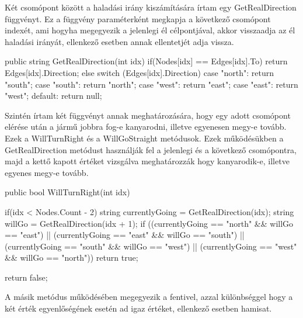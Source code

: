 Két csomópont között a haladási irány kiszámítására írtam egy GetRealDirection függvényt. Ez a függvény paraméterként megkapja a következő csomópont indexét, ami hogyha megegyezik a jelenlegi él célpontjával, akkor visszaadja az él haladási irányát, ellenkező esetben annak ellentetjét adja vissza.
\begin{cpp}
public string GetRealDirection(int idx)
        {
            if(Nodes[idx] == Edges[idx].To)
            {
                return Edges[idx].Direction;
            }
            else
            {
                switch (Edges[idx].Direction)
                {
                    case "north":
                        return "south";
                    case "south":
                        return "north";
                    case "west":
                        return "east";
                    case "east":
                        return "west";
                    default:
                        return null;
                }
            }
        }
\end{cpp}

Szintén írtam két függvényt annak meghatározására, hogy egy adott csomópont elérése után a jármű jobbra fog-e kanyarodni, illetve egyenesen megy-e tovább. Ezek a WillTurnRight és a WillGoStraight metódusok. Ezek működésükben a GetRealDirection metódust használják fel a jelenlegi és a következő csomópontra, majd a kettő kapott értéket vizsgálva meghatározzák hogy kanyarodik-e, illetve egyenes megy-e tovább.
\begin{cpp}
public bool WillTurnRight(int idx)
        {
            if(idx < Nodes.Count - 2)
            {
                string currentlyGoing = GetRealDirection(idx);
                string willGo = GetRealDirection(idx + 1);
                if ((currentlyGoing == "north" && willGo == "east") || 
                (currentlyGoing == "east" && willGo == "south") ||
                (currentlyGoing == "south" && willGo == "west") || 
	     (currentlyGoing == "west" && willGo == "north"))
                {
                    return true;
                }
            }
            
            return false;
        }
\end{cpp}
A másik metódus működésében megegyezik a fentivel, azzal különbséggel hogy a két érték egyenlőségének esetén ad igaz értéket, ellenkező esetben hamisat.

